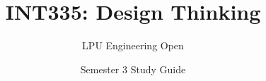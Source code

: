 \documentclass[a4paper,11pt,oneside,openany]{book}
\title{INT335: Design Thinking}
\author{LPU Engineering Open}
\date{Semester 3 Study Guide}
\begin{document}
\frontmatter

\makebookcover
\copyrightpage
\disclaimerpage

\tableofcontents
\newpage

\mainmatter







\end{document}
